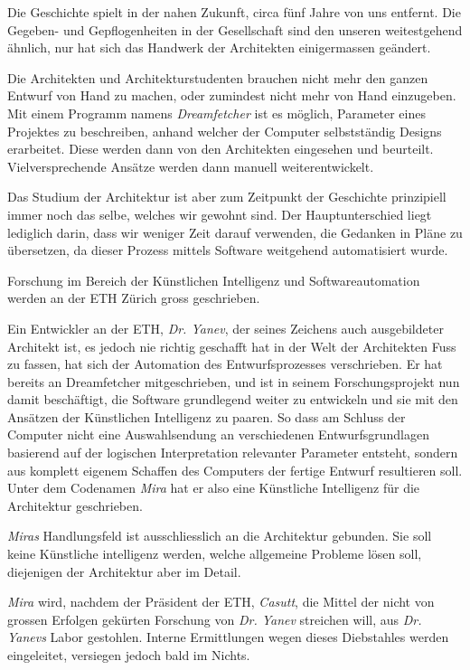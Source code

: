 \documentclass[11pt,a4paper,ngerman]{scrreprt}
\begin{document}
Die Geschichte spielt in der nahen Zukunft, circa fünf Jahre von uns
entfernt. Die Gegeben- und Gepflogenheiten in der Gesellschaft sind den unseren
weitestgehend ähnlich, nur hat sich das Handwerk der Architekten einigermassen
geändert.

Die Architekten und Architekturstudenten brauchen nicht mehr den ganzen Entwurf
von Hand zu machen, oder zumindest nicht mehr von Hand einzugeben. Mit einem
Programm namens \emph{Dreamfetcher} ist es möglich, Parameter eines Projektes zu
beschreiben, anhand welcher der Computer selbstständig Designs erarbeitet. Diese
werden dann von den Architekten eingesehen und beurteilt. Vielversprechende
Ansätze werden dann manuell weiterentwickelt.

Das Studium der Architektur ist aber zum Zeitpunkt der Geschichte prinzipiell
immer noch das selbe, welches wir gewohnt sind. Der Hauptunterschied liegt
lediglich darin, dass wir weniger Zeit darauf verwenden, die Gedanken in Pläne
zu übersetzen, da dieser Prozess mittels Software weitgehend automatisiert
wurde.

Forschung im Bereich der Künstlichen Intelligenz und Softwareautomation werden
an der ETH Zürich gross geschrieben.

Ein Entwickler an der ETH, \emph{Dr. Yanev}, der seines Zeichens auch ausgebildeter
Architekt ist, es jedoch nie richtig geschafft hat in der Welt der Architekten
Fuss zu fassen, hat sich der Automation des Entwurfsprozesses verschrieben. Er
hat bereits an Dreamfetcher mitgeschrieben, und ist in seinem Forschungsprojekt
nun damit beschäftigt, die Software grundlegend weiter zu entwickeln und sie mit
den Ansätzen der Künstlichen Intelligenz zu paaren. So dass am Schluss der
Computer nicht eine Auswahlsendung an verschiedenen Entwurfsgrundlagen basierend
auf der logischen Interpretation relevanter Parameter entsteht, sondern aus
komplett eigenem Schaffen des Computers der fertige Entwurf resultieren
soll. Unter dem Codenamen \emph{Mira} hat er also eine Künstliche Intelligenz für die
Architektur geschrieben.

\emph{Miras} Handlungsfeld ist ausschliesslich an die Architektur gebunden. Sie soll
keine Künstliche intelligenz werden, welche allgemeine Probleme lösen soll,
diejenigen der Architektur aber im Detail.

\emph{Mira} wird, nachdem der Präsident der ETH, \emph{Casutt}, die Mittel der nicht von
grossen Erfolgen gekürten Forschung von \emph{Dr. Yanev} streichen will, aus
\emph{Dr. Yanevs} Labor gestohlen. Interne Ermittlungen wegen dieses Diebstahles
werden eingeleitet, versiegen jedoch bald im Nichts.
\end{document}
